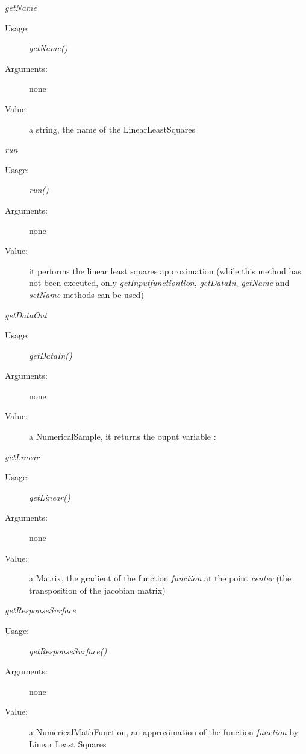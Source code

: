 \begin{description}
\begin{description}
\item \textit{getName}
\begin{description}
\item[Usage:] \textit{getName()}
\item[Arguments:] none
\item[Value:] a string, the name of the LinearLeastSquares
\end{description}
\bigskip


\item \textit{run}
\begin{description}
\item[Usage:] \textit{run()}
\item[Arguments:] none
\item[Value:] it performs the linear least squares approximation (while this method has not been executed, only \textit{getInputfunctiontion}, \textit{getDataIn}, \textit{getName} and \textit{setName} methods can be used)
\end{description}
\bigskip


\item \textit{getDataOut}
\begin{description}
\item[Usage:] \textit{getDataIn()}
\item[Arguments:] none
\item[Value:] a NumericalSample, it returns the ouput variable :
\end{description}
\bigskip

\item \textit{getLinear}
\begin{description}
\item[Usage:] \textit{getLinear()} %
\item[Arguments:] none
\item[Value:] a Matrix, the gradient of the function \textit{function} at the point \textit{center} (the transposition of the jacobian matrix)
\end{description}
\bigskip

\item \textit{getResponseSurface}
\begin{description}
\item[Usage:] \textit{getResponseSurface()} %
\item[Arguments:] none
\item[Value:] a NumericalMathFunction, an approximation of the function \textit{function} by Linear Least Squares
\end{description}


\end{description}
\end{description}

